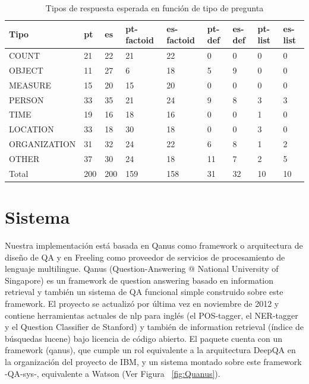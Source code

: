 \begin{center}
\begin{table}[H]
\centering
\begin{tabular}{| l | l | l | l | l | l |l |l|l|}
\hline
Tipo & pt & es & pt-factoid & es-factoid & pt-def & es-def & pt-list & es-list \\ \hline
COUNT & 21 & 22 & 21 & 22 & 0 & 0 & 0  & 0\\ \hline
OBJECT & 11 & 27 & 6  & 18 & 5 & 9 & 0  & 0\\ \hline
MEASURE & 15 & 20 & 15 & 20 & 0 & 0 & 0  & 0\\ \hline
PERSON & 33  & 35 & 21 & 24 & 9 & 8 & 3 & 3\\ \hline
TIME & 19 & 16 & 18 & 16 & 0 & 0 & 1 & 0\\ \hline
LOCATION & 33 & 18  & 30 & 18 & 0 & 0 & 3 & 0 \\ \hline
ORGANIZATION & 31 & 32 & 24 & 22 & 6 & 8 & 1 & 2\\ \hline
OTHER & 37 & 30 & 24 & 18 & 11 & 7 & 2 & 5 \\ \hline
Total & 200 & 200 & 159 & 158 & 31 & 32  & 10 & 10\\ \hline
\end{tabular}
\caption{Tipos de respuesta esperada en función de tipo de pregunta}
\label{table:tipo-general}
\end{table}
\end{center}


\section{Sistema}
\label{sec:sistema}

Nuestra implementación está basada en Qanus como framework o arquitectura de diseño de QA y en Freeling como proveedor de servicios de procesamiento de lenguaje multilingue. Qanus (Question-Answering @ National University of Singapore) es un framework de question answering basado en information retrieval y también un sistema de QA funcional simple construido sobre este framework. El proyecto se actualizó por última vez en noviembre de 2012 y contiene herramientas actuales de nlp para inglés (el POS-tagger, el NER-tagger y el Question Classifier de Stanford) y también de information retrieval (índice de búsquedas lucene) bajo licencia de código abierto. El paquete cuenta con un framework (qanus), que cumple un rol equivalente a la arquitectura DeepQA en la organización del proyecto de IBM, y un sistema montado sobre este framework -QA-sys-, equivalente a Watson (Ver Figura ~\ref{fig:Quanus}). 


